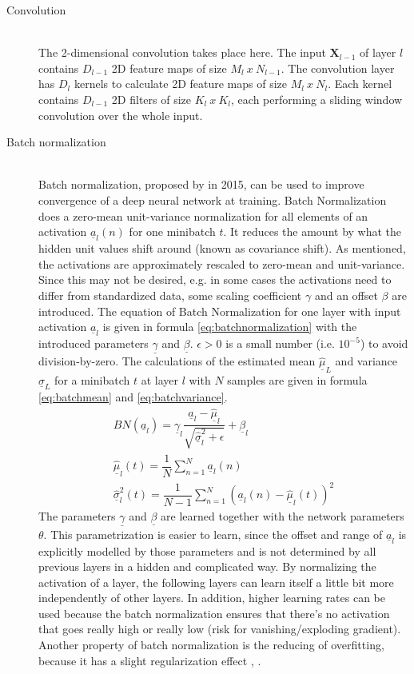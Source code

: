 \documentclass[12pt,DIV14,BCOR12mm,a4paper,footexclude,headinclude,halfparskip-,twoside,openright,cleardoubleempty,idxtotoc,bibtotoc,listtotoc,abstracton]{scrreprt} %
\numberwithin{equation}{chapter}
\begin{document}
\begin{description}
	\item[Convolution]\hfill \\
The 2-dimensional convolution takes place here. The input $\mathbf{X}_{l-1}$ of layer $l$ contains $D_{l-1}$ 2D feature maps of size $M_l\ x\ N_{l-1}			$. The convolution layer has $D_l$ kernels to calculate 2D feature maps of size $M_l\ x\ N_l$. Each kernel contains $D_{l-1}$ 2D filters of size $K_l\ 		x\ K_l$, each performing a sliding window convolution over the whole input.
	\item[Batch normalization]\hfill \\
Batch normalization, proposed by \cite{Ioffe15BatchNorm} in 2015, can be used to improve convergence of a deep neural network at training. Batch Normalization does a zero-mean unit-variance normalization for all elements of an activation $\underline{a}_l(n)$ for one minibatch $t$. It reduces the amount by what the hidden unit values shift around (known as covariance shift). As mentioned, the activations are approximately rescaled to zero-mean and unit-variance. Since this may not be desired, e.g. in some cases the activations need to differ from standardized data, some scaling coefficient $\gamma$ and an offset $\beta$ are introduced. The equation of Batch Normalization for one layer with input activation $\underline{a}_l$ is given in formula \ref{eq:batchnormalization} with the introduced parameters $\underline{\gamma}$ and $\underline{\beta}$. $\epsilon > 0$ is a small number (i.e. $10^{-5}$) to avoid division-by-zero. The calculations of the estimated mean $\underline{\hat{\mu}}_L$ and variance $\underline{\hat{\sigma}}_L$ for a minibatch $t$ at layer $l$ with  $N$ samples are given in formula \ref{eq:batchmean} and \ref{eq:batchvariance}.
\begin{align}
	BN(\underline{a}_l) = \underline{\gamma}_l\dfrac{\underline{a}_l-\underline{\hat{\mu}}_l}{\sqrt{\underline{\hat{\sigma}}_{l}^{2}+\epsilon}}+\underline{\beta}_l\label{eq:batchnormalization}\\
	\underline{\hat{\mu}}_l(t) = \dfrac{1}{N}\sum_{n=1}^{N}\underline{a}_l(n)\label{eq:batchmean}\\
	\underline{\hat{\sigma}}_{l}^{2}(t) = \dfrac{1}{N-1}\sum_{n=1}^{N}(\underline{a}_l(n)-\underline{\hat{\mu}}_l(t))^{2}\label{eq:batchvariance}
\end{align}		
The parameters $\underline{\gamma}$ and $\underline{\beta}$ are learned together with the network parameters $\theta$. This parametrization is easier to learn, since the offset and range of $\underline{a}_l$ is explicitly modelled by those parameters and is not determined by all previous layers in a hidden and complicated way. By normalizing the activation of a layer, the following layers can learn itself a little bit more independently of other layers. In addition, higher learning rates can be used because the batch normalization ensures that there's no activation that goes really high or really low (risk for vanishing/exploding gradient). Another property of batch normalization is the reducing of overfitting, because it has a slight regularization effect \cite{DeepLearningDive}, \cite{LectureNotes_DeepLearning}.

\end{description}
\end{document}
